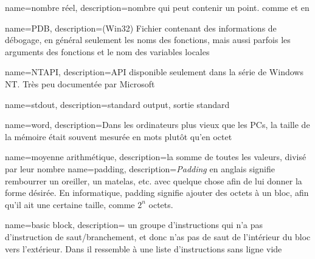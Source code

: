 {
  name={nombre réel},
  description={nombre qui peut contenir un point. comme \Tfloat et \Tdouble en \CCpp}
}

{
  name=PDB,
  description={(Win32) Fichier contenant des informations de débogage, en général seulement les noms des fonctions,
  mais aussi parfois les arguments des fonctions et le nom des variables locales}
}

{
  name=NTAPI,
  description={\ac{API} disponible seulement dans la série de Windows NT. Très peu documentée par Microsoft}
}

{
  name=stdout,
  description={standard output, sortie standard}
}

{
  name=word,
  description={Dans les ordinateurs plus vieux que les PCs, la taille de la mémoire était
  souvent mesurée en mots plutôt qu'en octet}
}

{
  name={moyenne arithmétique},
  description={la somme de toutes les valeurs, divisé par leur nombre}
}
{
  name=padding,
  description={\emph{Padding} en anglais signifie rembourrer un oreiller, un matelas, etc. avec quelque chose afin de lui donner la forme désirée.
  En informatique, padding signifie ajouter des octets à un bloc, afin qu'il ait une certaine taille, comme $2^n$ octets.}
}

{
  name=basic block,
  description={
	un groupe d'instructions qui n'a pas d'instruction de saut/branchement,
	et donc n'as pas de saut de l'intérieur du bloc vers l'extérieur.
	Dans \IDA il ressemble à une liste d'instructions sans ligne vide}
}
